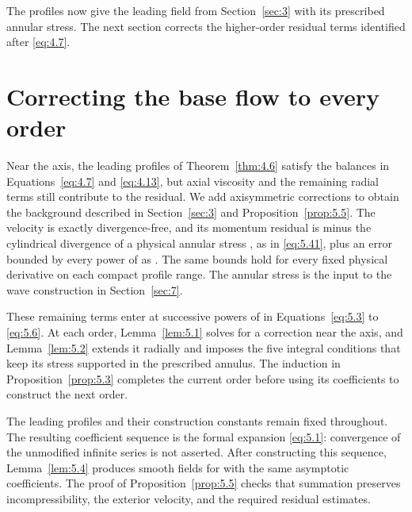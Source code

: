 The profiles now give the leading field from Section~\ref{sec:3} with its
prescribed annular stress. The next section corrects the higher-order residual
terms identified after \eqref{eq:4.7}.

\section{Correcting the base flow to every order}
\label{sec:5}

Near the axis, the leading profiles
 of Theorem~\ref{thm:4.6} satisfy the balances
in Equations~\eqref{eq:4.7} and \eqref{eq:4.13}, but axial viscosity and the
remaining radial terms still contribute to the residual. We add axisymmetric
corrections to obtain the background  described
in Section~\ref{sec:3} and Proposition~\ref{prop:5.5}. The velocity
 is exactly divergence-free, and its momentum residual
is minus the cylindrical divergence of a physical annular stress
, as in \eqref{eq:5.41}, plus an error
 bounded by every power of
 as . The same bounds
hold for every fixed physical derivative on each compact profile range. The
annular stress is the input to the wave construction in Section~\ref{sec:7}.

These remaining terms enter at successive powers of
 in Equations~\eqref{eq:5.3} to \eqref{eq:5.6}. At
each order, Lemma~\ref{lem:5.1} solves for a correction near the axis, and
Lemma~\ref{lem:5.2} extends it radially and imposes the five integral conditions
that keep its stress supported in the prescribed annulus. The induction in
Proposition~\ref{prop:5.3} completes the current order before using its
coefficients to construct the next order.

The leading profiles and their construction constants remain fixed throughout.
The resulting coefficient sequence is the formal expansion \eqref{eq:5.1}:
convergence of the unmodified infinite series is not asserted. After
constructing this sequence, Lemma~\ref{lem:5.4} produces smooth fields for
 with the same asymptotic coefficients. The proof of
Proposition~\ref{prop:5.5} checks that summation preserves incompressibility,
the exterior velocity, and the required residual estimates.

